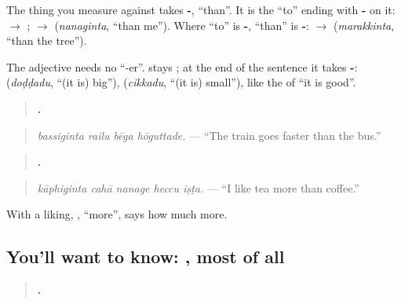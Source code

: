 The thing you measure against takes \textbf{-}, \textquotedblleft{}than\textquotedblright{}. It is the \textquotedblleft{}to\textquotedblright{} ending with \textbf{-} on it: \textbf{} $\to$ \textbf{}; \textbf{} $\to$ \textbf{} (\emph{nanaginta}, \textquotedblleft{}than me\textquotedblright{}). Where \textquotedblleft{}to\textquotedblright{} is \textbf{-}, \textquotedblleft{}than\textquotedblright{} is \textbf{-}: \textbf{} $\to$ \textbf{} (\emph{marakkinta}, \textquotedblleft{}than the tree\textquotedblright{}).

The adjective needs no \textquotedblleft{}-er\textquotedblright{}. \textbf{} stays \textbf{}; at the end of the sentence it takes \textbf{-}: \textbf{} (\emph{doḍḍadu}, \textquotedblleft{}(it is) big\textquotedblright{}), \textbf{} (\emph{cikkadu}, \textquotedblleft{}(it is) small\textquotedblright{}), like the \textbf{} of \textquotedblleft{}it is good\textquotedblright{}.

\begin{quote}
\textbf{   .}
\end{quote}

\begin{quote}
\emph{bassiginta railu bēga hōguttade.} — \textquotedblleft{}The train goes faster than the bus.\textquotedblright{}
\end{quote}

\begin{quote}
\textbf{    .}
\end{quote}

\begin{quote}
\emph{kāphiginta cahā nanage heccu iṣṭa.} — \textquotedblleft{}I like tea more than coffee.\textquotedblright{}
\end{quote}

With a liking, \textbf{}, \textquotedblleft{}more\textquotedblright{}, says how much more.

\subsection*{You'll want to know: , most of all}
\begin{quote}
\textbf{   .}
\end{quote}

